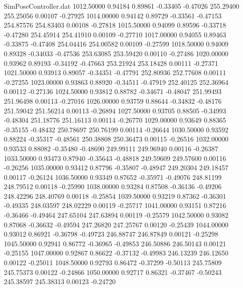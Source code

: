 \begin{filecontents}{SimPoseController.dat}
1012.50000    0.94184    0.89861    -0.33405   -0.47026  255.29400  255.25056    0.00107   -0.27925
1014.00000    0.94142    0.89729    -0.33561   -0.47153  254.87576  254.83403    0.00108   -0.27818
1015.50000    0.94099    0.89596    -0.33718   -0.47280  254.45914  254.41910    0.00109   -0.27710
1017.00000    0.94055    0.89463    -0.33875   -0.47408  254.04416  254.00582    0.00109   -0.27599
1018.50000    0.94009    0.89328    -0.34033   -0.47536  253.63085  253.59420    0.00110   -0.27486
1020.00000    0.93962    0.89193    -0.34192   -0.47663  253.21924  253.18428    0.00111   -0.27371
1021.50000    0.93913    0.89057    -0.34351   -0.47791  252.80936  252.77608    0.00111   -0.27255
1023.00000    0.93863    0.88920    -0.34511   -0.47919  252.40125  252.36964    0.00112   -0.27136
1024.50000    0.93812    0.88782    -0.34671   -0.48047  251.99493  251.96498    0.00113   -0.27016
1026.00000    0.93759    0.88644    -0.34832   -0.48176  251.59042  251.56214    0.00113   -0.26894
1027.50000    0.93705    0.88505    -0.34993   -0.48304  251.18776  251.16113    0.00114   -0.26770
1029.00000    0.93649    0.88365    -0.35155   -0.48432  250.78697  250.76199    0.00114   -0.26644
1030.50000    0.93592    0.88224    -0.35317   -0.48561  250.38808  250.36473    0.00115   -0.26516
1032.00000    0.93533    0.88082    -0.35480   -0.48690  249.99111  249.96940    0.00116   -0.26387
1033.50000    0.93473    0.87940    -0.35643   -0.48818  249.59609  249.57600    0.00116   -0.26256
1035.00000    0.93412    0.87796    -0.35807   -0.48947  249.20304  249.18457    0.00117   -0.26124
1036.50000    0.93349    0.87652    -0.35971   -0.49076  248.81199  248.79512    0.00118   -0.25990
1038.00000    0.93284    0.87508    -0.36136   -0.49206  248.42296  248.40769    0.00118   -0.25854
1039.50000    0.93219    0.87362    -0.36301   -0.49335  248.03597  248.02229    0.00119   -0.25717
1041.00000    0.93151    0.87216    -0.36466   -0.49464  247.65104  247.63894    0.00119   -0.25579
1042.50000    0.93082    0.87068    -0.36632   -0.49594  247.26820  247.25767    0.00120   -0.25439
1044.00000    0.93012    0.86921    -0.36798   -0.49723  246.88747  246.87849    0.00121   -0.25298
1045.50000    0.92941    0.86772    -0.36965   -0.49853  246.50886  246.50143    0.00121   -0.25155
1047.00000    0.92867    0.86622    -0.37132   -0.49983  246.13239  246.12650    0.00122   -0.25011
1048.50000    0.92793    0.86472    -0.37299   -0.50113  245.75809  245.75373    0.00122   -0.24866
1050.00000    0.92717    0.86321    -0.37467   -0.50243  245.38597  245.38313    0.00123   -0.24720

\end{filecontents}
